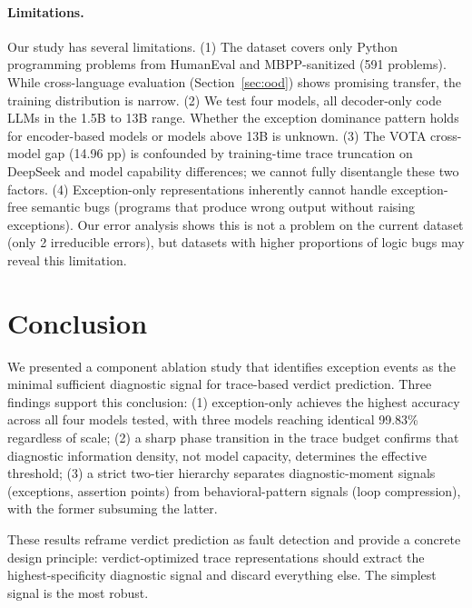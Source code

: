 \documentclass[11pt]{article}
\begin{document}
\paragraph{Limitations.}
Our study has several limitations. (1) The dataset covers only Python programming problems from HumanEval and MBPP-sanitized (591 problems). While cross-language evaluation (Section~\ref{sec:ood}) shows promising transfer, the training distribution is narrow. (2) We test four models, all decoder-only code LLMs in the 1.5B to 13B range. Whether the exception dominance pattern holds for encoder-based models or models above 13B is unknown. (3) The VOTA cross-model gap (14.96 pp) is confounded by training-time trace truncation on DeepSeek and model capability differences; we cannot fully disentangle these two factors. (4) Exception-only representations inherently cannot handle exception-free semantic bugs (programs that produce wrong output without raising exceptions). Our error analysis shows this is not a problem on the current dataset (only 2 irreducible errors), but datasets with higher proportions of logic bugs may reveal this limitation.

\section{Conclusion}

We presented a component ablation study that identifies exception events as the minimal sufficient diagnostic signal for trace-based verdict prediction. Three findings support this conclusion: (1) exception-only achieves the highest accuracy across all four models tested, with three models reaching identical 99.83\% regardless of scale; (2) a sharp phase transition in the trace budget confirms that diagnostic information density, not model capacity, determines the effective threshold; (3) a strict two-tier hierarchy separates diagnostic-moment signals (exceptions, assertion points) from behavioral-pattern signals (loop compression), with the former subsuming the latter.

These results reframe verdict prediction as fault detection and provide a concrete design principle: verdict-optimized trace representations should extract the highest-specificity diagnostic signal and discard everything else. The simplest signal is the most robust.
\end{document}
